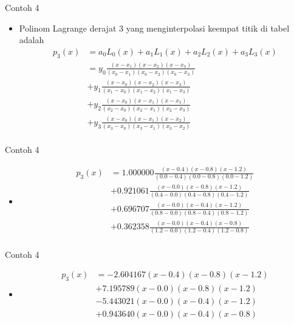 \documentclass[pdflatex,compress,mathserif]{beamer}
\begin{document}
\begin{frame}{Contoh 4}
	\begin{itemize}
		\item Polinom Lagrange derajat 3 yang menginterpolasi keempat titik di tabel adalah
		\begin{align*}
			p_3 (x) &= a_0 L_0 (x) + a_1 L_1 (x) + a_2 L_2 (x) + a_3 L_3 (x) \\
			&= y_0 \frac{(x-x_1)(x-x_2)(x-x_3)}{(x_0-x_1)(x_0-x_2)(x_0-x_3)} \\
			&+ y_1 \frac{(x-x_0)(x-x_2)(x-x_3)}{(x_1-x_0)(x_1-x_2)(x_1-x_3)} \\
			&+ y_2 \frac{(x-x_0)(x-x_1)(x-x_3)}{(x_2-x_0)(x_2-x_1)(x_2-x_3)} \\
			&+ y_3 \frac{(x-x_0)(x-x_1)(x-x_2)}{(x_3-x_0)(x_3-x_1)(x_3-x_2)} \\
		\end{align*}
	\end{itemize}
\end{frame}

\begin{frame}{Contoh 4}
	\begin{itemize}
		\item[]
		\begin{align*}
		p_3 (x) &= 1.000000 \frac{(x-0.4)(x-0.8)(x-1.2)}{(0.0-0.4)(0.0-0.8)(0.0-1.2)} \\
		&+ 0.921061 \frac{(x - 0.0 )(x - 0.8)(x - 1.2)}{(0.4 - 0.0)( 0.4 - 0.8 )( 0.4 - 1.2 )} \\
		&+ 0.696707 \frac{(x - 0.0 )(x - 0.4)(x - 1.2)}{(0.8 - 0.0)( 0.8 - 0.4 )( 0.8 - 1.2 )} \\
		&+ 0.362358 \frac{(x - 0.0 )(x - 0.4)(x - 0.8)}{(1.2 - 0.0)( 1.2 - 0.4 )( 1.2 - 0.8 )} \\
		\end{align*}
	\end{itemize}
\end{frame}

\begin{frame}{Contoh 4}
	\begin{itemize}
		\item[]
		\begin{align*}
		p_3 (x) &= - 2.604167 ( x - 0.4 )( x - 0.8 )( x - 1.2 ) \\
		&+ 7.195789 ( x - 0.0 )( x - 0.8 )( x - 1.2 ) \\
		&- 5.443021 ( x - 0.0 )( x - 0.4 )( x - 1.2 )\\
		&+ 0.943640 ( x - 0.0 )( x - 0.4 )( x - 0.8 )
		\end{align*}
	\end{itemize}
\end{frame}
\end{document}
